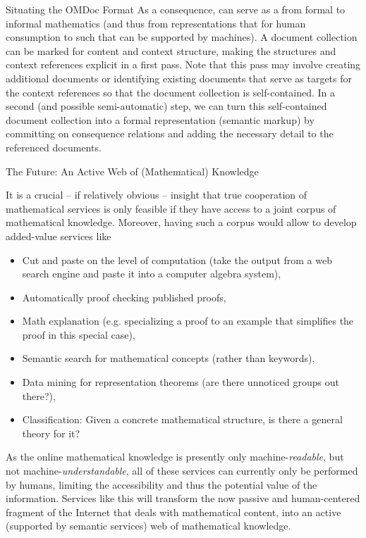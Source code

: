 \begin{omgroup}[id=omdoc-markup,short=Open Mathematical Documents]
\begin{module}[id=situating-OMDoc]
\begin{omgroup}{Situating the OMDoc Format}
As a consequence, {\omdoc} can serve as a {} from formal to
informal mathematics (and thus from representations that for human consumption to such
that can be supported by machines). A document collection can be marked for content and
context structure, making the structures and context references explicit in a first
pass. Note that this pass may involve creating additional documents or identifying
existing documents that serve as targets for the context references so that the document
collection is self-contained.  In a second (and possible semi-automatic) step, we can turn
this self-contained document collection into a formal representation (semantic markup) by
committing on consequence relations and adding the necessary detail to the referenced
documents.
\end{omgroup}
\end{module}

\begin{omgroup}[id=mathweb]{The Future: An Active Web of (Mathematical) Knowledge}

It is a crucial -- if relatively obvious -- insight that true cooperation of
mathematical services is only feasible if they have access to a joint corpus of
mathematical knowledge. Moreover, having such a corpus would allow to develop
added-value services like
\begin{itemize}
\item Cut and paste on the level of computation (take the output from a web search engine
  and paste it into a computer algebra system),
\item Automatically proof checking published proofs,
\item Math explanation (e.g. specializing a proof to an example that simplifies the proof
  in this special case),
\item Semantic search for mathematical concepts (rather than keywords),
\item Data mining for representation theorems (are there unnoticed groups out there?),
\item Classification: Given a concrete mathematical structure, is there a general theory
  for it?
\end{itemize}
As the online mathematical knowledge is presently only machine-{\emph{readable}}, but not
machine-{\emph{understandable}}, all of these services can currently only be performed by
humans, limiting the accessibility and thus the potential value of the
information. Services like this will transform the now passive and human-centered fragment
of the Internet that deals with mathematical content, into an active (supported by
semantic services) web of mathematical knowledge.


\end{omgroup}
\end{omgroup}
